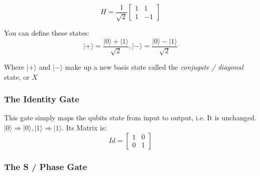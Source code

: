 \documentclass[../main.tex]{subfiles}
\begin{document}
\begin{equation}
	H = \frac{1}{\sqrt{2}} \left[ \begin{matrix} 1 & 1\\1 & -1\end{matrix} \right]
\end{equation}

You can define these states:\\

\begin{equation}
	\lvert+\rangle = \frac{\lvert0\rangle +\lvert1\rangle}{\sqrt{2}}, 
	\lvert-\rangle = \frac{\lvert0\rangle -\lvert1\rangle}{\sqrt{2}}
\end{equation}

Where \(\lvert+\rangle\) and \(\lvert-\rangle\) make up a new basis state called
the \emph{conjugate / diagonal} state, or \(X\)

\subsubsection{The Identity Gate}

This gate simply maps the qubits state from input to output, i.e. It is
unchanged. $|0\rangle \Rightarrow |0\rangle, |1\rangle \Rightarrow |1\rangle$. Its Matrix is:\\
\begin{equation}
	Id = \left[ \begin{matrix} 1 & 0\\0 & 1\end{matrix} \right]
\end{equation}

\subsubsection{The S / Phase Gate}
\end{document}
